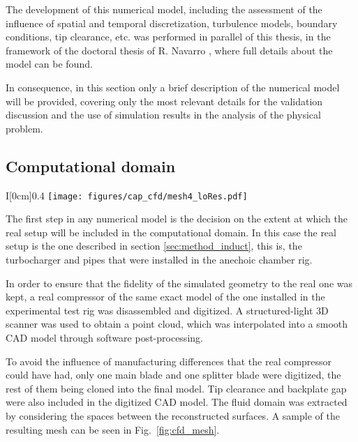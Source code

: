 The development of this numerical model, including the assessment of the influence of spatial and temporal discretization, turbulence models, boundary conditions, tip clearance, etc. was performed in parallel of this thesis, in the framework of the doctoral thesis of R. Navarro \cite{navarro2014numerical}, where full details about the model can be found.

In consequence, in this section only a brief description of the numerical model will be provided, covering only the most relevant details for the validation discussion and the use of simulation results in the analysis of the physical problem.

\subsection{Computational domain}

\begin{wrapfigure}[16]{I}[0cm]{0.4\textwidth}
\raggedleft
\vspace{-4mm}
\texttt{[image: figures/cap\_cfd/mesh4\_loRes.pdf]}
\caption[Sample of the mesh in the CFD model]{Polyhedral mesh of the rotor walls (grey) and the surrounding fluid (blue) used in the CFD model.}
\label{fig:cfd_mesh}
\end{wrapfigure}

The first step in any numerical model is the decision on the extent at which the real setup will be included in the computational domain. In this case the real setup is the one described in section \ref{sec:method_induct}, this is, the turbocharger and pipes that were installed in the anechoic chamber rig. 

In order to ensure that the fidelity of the simulated geometry to the real one was kept, a real compressor of the same exact model of the one installed in the experimental test rig was disassembled and digitized. A structured-light 3D scanner was used to obtain a point cloud, which was interpolated into a smooth CAD model through software post-processing.

To avoid the influence of manufacturing differences that the real compressor could have had, only one main blade and one splitter blade were digitized, the rest of them being cloned into the final model. Tip clearance and backplate gap were also included in the digitized CAD model. The fluid domain was extracted by considering the spaces between the reconstructed surfaces. A sample of the resulting mesh can be seen in Fig.~\ref{fig:cfd_mesh}.

